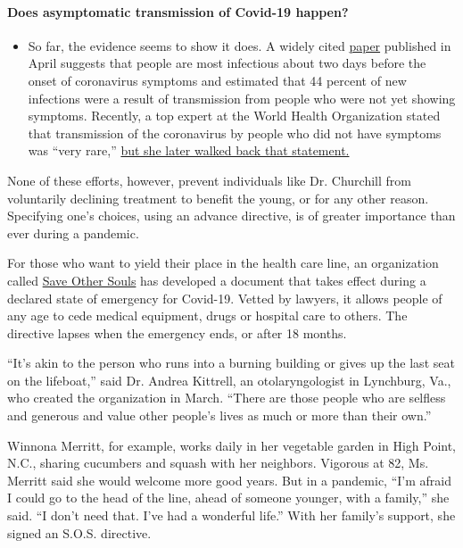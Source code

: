 \begin{itemize}
{  \paragraph{Does asymptomatic transmission of Covid-19
  happen?}\label{does-asymptomatic-transmission-of-covid-19-happen}}

  \begin{itemize}
  \tightlist
  \item
    So far, the evidence seems to show it does. A widely cited
    \href{https://www.nature.com/articles/s41591-020-0869-5}{paper}
    published in April suggests that people are most infectious about
    two days before the onset of coronavirus symptoms and estimated that
    44 percent of new infections were a result of transmission from
    people who were not yet showing symptoms. Recently, a top expert at
    the World Health Organization stated that transmission of the
    coronavirus by people who did not have symptoms was ``very rare,''
    \href{https://www.nytimes.com/2020/06/09/world/coronavirus-updates.html?action=click\&pgtype=Article\&state=default\&region=MAIN_CONTENT_3\&context=storylines_faq\#link-1f302e21}{but
    she later walked back that statement.}
  \end{itemize}
\end{itemize}

None of these efforts, however, prevent individuals like Dr. Churchill
from voluntarily declining treatment to benefit the young, or for any
other reason. Specifying one's choices, using an advance directive, is
of greater importance than ever during a pandemic.

For those who want to yield their place in the health care line, an
organization called \href{https://www.saveothersouls.org/}{Save Other
Souls} has developed a document that takes effect during a declared
state of emergency for Covid-19. Vetted by lawyers, it allows people of
any age to cede medical equipment, drugs or hospital care to others. The
directive lapses when the emergency ends, or after 18 months.

``It's akin to the person who runs into a burning building or gives up
the last seat on the lifeboat,'' said Dr. Andrea Kittrell, an
otolaryngologist in Lynchburg, Va., who created the organization in
March. ``There are those people who are selfless and generous and value
other people's lives as much or more than their own.''

Winnona Merritt, for example, works daily in her vegetable garden in
High Point, N.C., sharing cucumbers and squash with her neighbors.
Vigorous at 82, Ms. Merritt said she would welcome more good years. But
in a pandemic, ``I'm afraid I could go to the head of the line, ahead of
someone younger, with a family,'' she said. ``I don't need that. I've
had a wonderful life.'' With her family's support, she signed an S.O.S.
directive.

